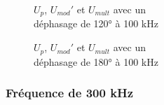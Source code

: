 \begin{figure}[H]
    \begin{minipage}[c]{.50\linewidth}
        \centering
        \caption{$U_{p}$, $U_{mod}'$ et $U_{mult}$ avec un\\ déphasage de 120° à 100 kHz }
    \label{fig:oc13}
    \end{minipage}
    \hfill%
    \begin{minipage}[c]{.50\linewidth}
        \centering
       \caption{$U_{p}$, $U_{mod}'$ et $U_{mult}$ avec un \\ déphasage de 180° à 100 kHz}
 \label{fig:oc14}
    \end{minipage}
\end{figure}


\subsubsection{Fréquence de 300 kHz}


